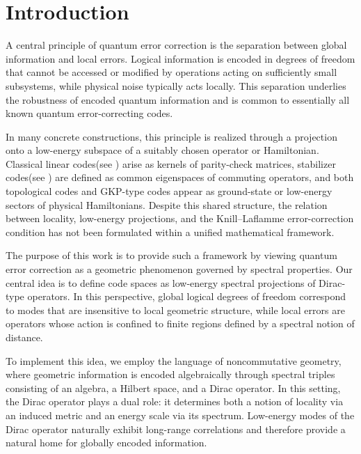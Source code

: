 \documentclass[12pt]{article}
\theoremstyle{definition} %
\theoremstyle{plain} %
\theoremstyle{remark} %
\theoremstyle{underline}
\begin{document}
\section{Introduction}



A central principle of quantum error correction is the separation between global information and local errors. Logical information is encoded in degrees of freedom that cannot be accessed or modified by operations acting on sufficiently small subsystems, while physical noise typically acts locally. This separation underlies the robustness of encoded quantum information and is common to essentially all known quantum error-correcting codes.

In many concrete constructions, this principle is realized through a projection onto a low-energy subspace of a suitably chosen operator or Hamiltonian. Classical linear codes(see \cite{macwilliams1977theory}) arise as kernels of parity-check matrices, stabilizer codes(see \cite{gottesman1997stabilizer}) are defined as common eigenspaces of commuting operators, and both topological codes\cite{Kitaev:1997wr,dennis2002topological} and GKP-type codes\cite{gottesman2000encoding} appear as ground-state or low-energy sectors of physical Hamiltonians. Despite this shared structure, the relation between locality, low-energy projections, and the Knill--Laflamme error-correction condition has not been formulated within a unified mathematical framework.

The purpose of this work is to provide such a framework by viewing quantum error correction as a geometric phenomenon governed by spectral properties. Our central idea is to define code spaces as low-energy spectral projections of Dirac-type operators. In this perspective, global logical degrees of freedom correspond to modes that are insensitive to local geometric structure, while local errors are operators whose action is confined to finite regions defined by a spectral notion of distance.

To implement this idea, we employ the language of noncommutative geometry\cite{Landi:1997sh,Connes:1994yd,connes1985non,connes2000short}, where geometric information is encoded algebraically through spectral triples consisting of an algebra, a Hilbert space, and a Dirac operator. In this setting, the Dirac operator plays a dual role: it determines both a notion of locality via an induced metric and an energy scale via its spectrum. Low-energy modes of the Dirac operator naturally exhibit long-range correlations and therefore provide a natural home for globally encoded information.
\end{document}
